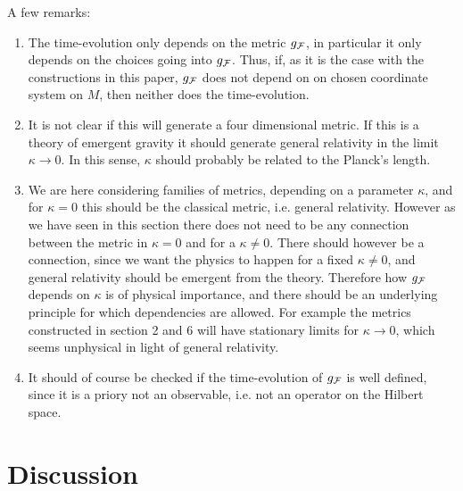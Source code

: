 \documentclass[letterpaper,11pt]{article}
\def\cf{{\cal F}}
\begin{document}
A few remarks: 
\begin{enumerate}
    \item The time-evolution only depends on the metric $g_{\cf}$, in particular it only depends on the choices going into $g_{\cf}$. Thus, if, as it is the case with the constructions in this paper, $g_{\cf}$ does not depend on on chosen coordinate system on $M$, then neither does the time-evolution.
    \item It is not clear if this will generate a four dimensional metric. If this is a theory of emergent gravity it should generate general relativity in the limit $\kappa \to 0$. In this sense, $\kappa$ should probably be related to the Planck's length. 
    \item We are here considering families of metrics, depending on a parameter $\kappa$, and for $\kappa =0$ this should be the classical metric, i.e. general relativity. However as we have seen in this section there does not need to be any connection between the metric in $\kappa =0$ and for a $\kappa \not= 0$. There should however be a connection, since we want the physics to happen for a fixed $\kappa \not=0$, and general relativity should be emergent from the theory. Therefore how $g_{\cf}$ depends on $\kappa$ is of physical importance, and there should be an underlying principle for which dependencies are allowed. For example the metrics constructed in section 2 and 6 will have stationary limits for $\kappa \to 0$, which seems  unphysical in light of general relativity. 
    \item It should of course be checked if the time-evolution of $g_{\cf}$ is well defined, since it is a priory not an observable, i.e. not an operator on the Hilbert space.
\end{enumerate}


































\section{Discussion}
\end{document}
